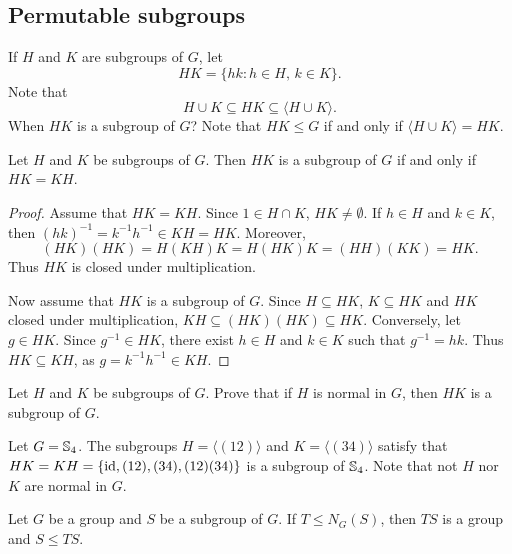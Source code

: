 \section{}

\subsection{Permutable subgroups}

If $H$ and $K$ are subgroups of $G$, let 
\[
        HK=\{hk:h\in H,\,k\in K\}.
\]
Note that 
\[
H\cup K\subseteq HK\subseteq\langle H\cup K\rangle.
\]
When $HK$ is a subgroup of $G$? 
Note that $HK\leq G$ if and only if $\langle H\cup K\rangle=HK$.

\begin{proposition}
        Let $H$ and $K$ be subgroups of $G$. Then $HK$ is a subgroup of
        $G$ if and only if $HK=KH$.
\end{proposition}

\begin{proof}
    Assume that $HK=KH$. Since $1\in H\cap K$, $HK\ne\emptyset$. 
    If $h\in H$ and $k\in K$, then $(hk)^{-1}=k^{-1}h^{-1}\in KH=HK$. Moreover, 
    \[
    (HK)(HK)=H(KH)K=H(HK)K=(HH)(KK)=HK.
    \]
    Thus $HK$ is closed under multiplication. 

    Now assume that $HK$ is a subgroup of $G$. Since $H\subseteq HK$,
    $K\subseteq HK$ and $HK$ closed under multiplication,
        $KH\subseteq (HK)(HK)\subseteq HK$. Conversely, let $g\in HK$.
        Since $g^{-1}\in HK$, there exist $h\in H$ and $k\in K$ such that
        $g^{-1}=hk$.
        Thus $HK\subseteq KH$, as 
        $g=k^{-1}h^{-1}\in KH$.
\end{proof}

\begin{exercise}
\label{xca:HK_normal}
Let $H$ and $K$ be subgroups of $G$. Prove that 
if $H$ is normal in $G$, then $HK$ is a subgroup of $G$.
\end{exercise}

\begin{example}
Let $G=\mathbb{S}_4$. The subgroups $H=\langle (12)\rangle$ and $K=\langle (34)\rangle$ satisfy that $HK=KH=\{
\operatorname{id},(12),(34),(12)(34)\}$ is a subgroup of 
$\mathbb{S}_4$. Note that not $H$ nor $K$
are normal in $G$.
\end{example}

\begin{exercise}
Let $G$ be a group and $S$ be a subgroup of $G$. 
If $T\leq N_G(S)$, then $TS$ is a group and $S\leq TS$.
\end{exercise}

